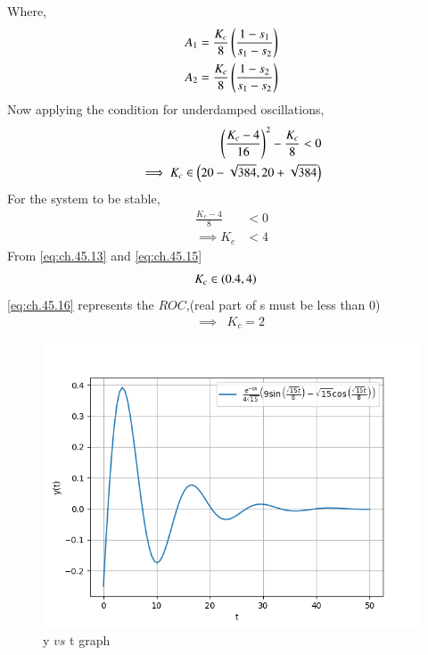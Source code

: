 \documentclass[journal,12pt,twocolumn]{IEEEtran}
\theoremstyle{remark}
\begin{document}
Where,
\begin{align}
    A_1 &= \frac{K_c}{8} \left(\frac{1-s_1}{s_1-s_2}\right)    \\
    A_2 &= \frac{K_c}{8} \left(\frac{1-s_2}{s_1-s_2}\right)    
\end{align}
Now applying the condition for underdamped oscillations,
\begin{align}
    \left(\frac{K_c-4}{16}\right)^2 - \frac{K_c}{8} < 0    \\
    \implies K_c \in \left(20-\sqrt{384} , 20+\sqrt{384}\right)   \label{eq:ch.45.13}
\end{align}
For the system to be stable,
\begin{align}
    \frac{K_c-4}{8}&<0   \\
    \implies K_c&<4 \label{eq:ch.45.15}
\end{align}
From \eqref{eq:ch.45.13} and \eqref{eq:ch.45.15}
\begin{align}
    &K_c \in \left(0.4,4\right)    \label{eq:ch.45.16}
\end{align}
\eqref{eq:ch.45.16} represents the $ROC$,(real part of s must be less than 0)
\begin{align}
    \implies &K_c=2
\end{align}
\begin{figure}[htbp]
    \centering
    \includegraphics[width=\columnwidth]{figs/b.png}
    \caption{y $vs$ t graph}
    \label{fig:ch.45.2}
\end{figure}     
\end{document}
